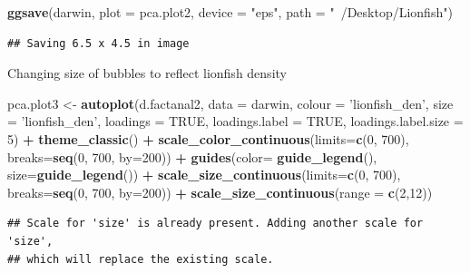 \documentclass[]{article}
\newenvironment{Shaded}{\begin{snugshade}}{\end{snugshade}}
\newcommand{\KeywordTok}[1]{\textcolor[rgb]{0.13,0.29,0.53}{\textbf{#1}}}
\newcommand{\DataTypeTok}[1]{\textcolor[rgb]{0.13,0.29,0.53}{#1}}
\newcommand{\DecValTok}[1]{\textcolor[rgb]{0.00,0.00,0.81}{#1}}
\newcommand{\StringTok}[1]{\textcolor[rgb]{0.31,0.60,0.02}{#1}}
\newcommand{\OtherTok}[1]{\textcolor[rgb]{0.56,0.35,0.01}{#1}}
\newcommand{\OperatorTok}[1]{\textcolor[rgb]{0.81,0.36,0.00}{\textbf{#1}}}
\newcommand{\NormalTok}[1]{#1}
\begin{document}
\begin{Shaded}
\begin{Highlighting}[]
\KeywordTok{ggsave}\NormalTok{(darwin, }\DataTypeTok{plot =}\NormalTok{ pca.plot2, }\DataTypeTok{device =} \StringTok{"eps"}\NormalTok{, }\DataTypeTok{path =} \StringTok{"~/Desktop/Lionfish"}\NormalTok{)}
\end{Highlighting}
\end{Shaded}

\begin{verbatim}
## Saving 6.5 x 4.5 in image
\end{verbatim}

Changing size of bubbles to reflect lionfish density

\begin{Shaded}
\begin{Highlighting}[]
\NormalTok{pca.plot3 <-}\StringTok{ }\KeywordTok{autoplot}\NormalTok{(d.factanal2, }\DataTypeTok{data =}\NormalTok{ darwin, }\DataTypeTok{colour =} \StringTok{'lionfish_den'}\NormalTok{, }\DataTypeTok{size =} \StringTok{'lionfish_den'}\NormalTok{,}
         \DataTypeTok{loadings =} \OtherTok{TRUE}\NormalTok{, }\DataTypeTok{loadings.label =} \OtherTok{TRUE}\NormalTok{, }\DataTypeTok{loadings.label.size  =} \DecValTok{5}\NormalTok{) }\OperatorTok{+}\StringTok{ }\KeywordTok{theme_classic}\NormalTok{() }\OperatorTok{+}\StringTok{  }\KeywordTok{scale_color_continuous}\NormalTok{(}\DataTypeTok{limits=}\KeywordTok{c}\NormalTok{(}\DecValTok{0}\NormalTok{, }\DecValTok{700}\NormalTok{), }\DataTypeTok{breaks=}\KeywordTok{seq}\NormalTok{(}\DecValTok{0}\NormalTok{, }\DecValTok{700}\NormalTok{, }\DataTypeTok{by=}\DecValTok{200}\NormalTok{)) }\OperatorTok{+}
\StringTok{   }\KeywordTok{guides}\NormalTok{(}\DataTypeTok{color=} \KeywordTok{guide_legend}\NormalTok{(), }\DataTypeTok{size=}\KeywordTok{guide_legend}\NormalTok{()) }\OperatorTok{+}\StringTok{ }\KeywordTok{scale_size_continuous}\NormalTok{(}\DataTypeTok{limits=}\KeywordTok{c}\NormalTok{(}\DecValTok{0}\NormalTok{, }\DecValTok{700}\NormalTok{), }\DataTypeTok{breaks=}\KeywordTok{seq}\NormalTok{(}\DecValTok{0}\NormalTok{, }\DecValTok{700}\NormalTok{, }\DataTypeTok{by=}\DecValTok{200}\NormalTok{)) }\OperatorTok{+}\StringTok{ }\KeywordTok{scale_size_continuous}\NormalTok{(}\DataTypeTok{range =} \KeywordTok{c}\NormalTok{(}\DecValTok{2}\NormalTok{,}\DecValTok{12}\NormalTok{))}
\end{Highlighting}
\end{Shaded}

\begin{verbatim}
## Scale for 'size' is already present. Adding another scale for 'size',
## which will replace the existing scale.
\end{verbatim}
\end{document}
